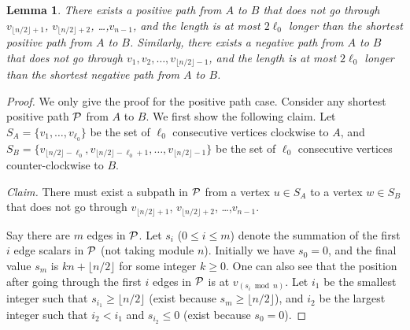 \documentclass[11pt]{article}
\newtheorem{lem}{Lemma}
\begin{document}
\begin{lem} \label{lemma:ABshort}
There exists a positive path from $A$ to $B$ that does not go through $v_{\lfloor n/2\rfloor+1}$, $v_{\lfloor n/2\rfloor+2}$, \ldots,$v_{n-1}$, and the length is 
	at most $2\ell_0$ longer than the shortest positive path from $A$ to $B$.
Similarly, there exists a negative path from $A$ to $B$ that does not go through $v_1,v_2,\ldots,v_{\lfloor n/2\rfloor-1}$, and the length is at most $2\ell_0$ longer than the shortest negative path from $A$ to $B$.
\end{lem}
\begin{proof}
We only give the proof for the positive path case. 
Consider any shortest positive path $\cal P$ from $A$ to $B$. 
We first show the following claim.
Let $S_A = \{v_1,\ldots,v_{\ell_0}\}$ be the set of 
	$\ell_0$ consecutive vertices clockwise to $A$, and
	$S_B  = \{v_{\lfloor n/2\rfloor-\ell_0},v_{\lfloor n/2\rfloor-\ell_0+1},
	\ldots,v_{\lfloor n/2\rfloor-1}\}$ be the set of $\ell_0$ consecutive
	vertices counter-clockwise to $B$.

{\em Claim.} There must exist a subpath in $\cal P$ from 
	a vertex $u \in S_A$ to a vertex $w \in S_B$ that does not go 
	through $v_{\lfloor n/2\rfloor+1}$, $v_{\lfloor n/2\rfloor+2}$, \ldots,$v_{n-1}$. 


Say there are $m$ edges in $\cal P$. Let $s_i$ ($0\le i\le m$) denote the summation of the first $i$ edge scalars in $\cal P$ (not taking module $n$). Initially we have $s_0=0$, and the final value $s_m$ is $kn+\lfloor n/2\rfloor$ for some integer $k\ge 0$. One can also see that the position after going through the first $i$ edges in $\cal P$ is at $v_{(s_i\bmod n)}$. Let $i_1$ be the smallest integer such that $s_{i_1}\geq\lfloor n/2\rfloor$ (exist because $s_m\geq\lfloor n/2\rfloor$), and $i_2$ be the largest integer such that $i_2<i_1$ and $s_{i_2}\leq0$ (exist because $s_0=0$).


\end{proof}
\end{document}
